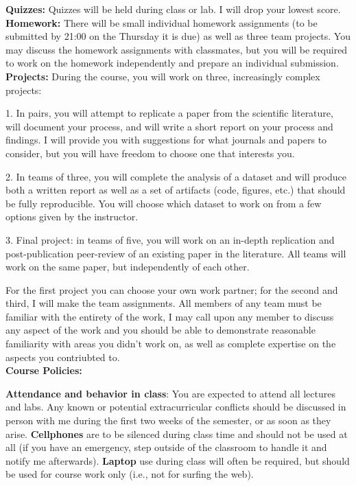 \documentclass[11pt]{article}
\begin{document}
\textbf{Quizzes:} Quizzes will be held during class or lab.  I will drop your
lowest score.\\

\textbf{Homework:} There will be small individual homework assignments (to be
submitted by 21:00 on the Thursday it is due) as well as three team projects.
You may discuss the homework assignments with classmates, but you will be
required to work on the homework independently and prepare an individual
submission.\\


\textbf{Projects:} During the course, you will work on three, increasingly
complex projects:

1. In pairs, you will attempt to replicate a paper from the scientific
literature, will document your process, and will write a short report on your
process and findings.  I will provide you with suggestions for what journals and
papers to consider, but you will have freedom to choose one that interests you.

2. In teams of three, you will complete the analysis of a dataset and will produce both a written report as well as a set of artifacts (code, figures, etc.) that should be fully reproducible.  You will choose which dataset to work on from a few options given by the instructor.

3. Final project: in teams of five, you will work on an in-depth replication and post-publication peer-review of an existing paper in the literature.  All teams will  work on the same paper, but independently of each other.


For the first project you can choose your own work partner; for the second and third, I will make the team assignments. All members of any team must be familiar with the entirety of the work, I may call upon any member to discuss any aspect of the work and you should be able to demonstrate reasonable familiarity with areas you didn't work on, as well as complete expertise on the aspects you contriubted to.\\


\textbf{\large Course Policies:}

\textbf{Attendance and behavior in class}: You are expected to attend all lectures
and labs.  Any known or potential extracurricular conflicts should be discussed
in person with me during the first two weeks of the semester, or as
soon as they arise. \textbf{Cellphones} are to be silenced during class time and should not be used at all (if you have an emergency, step outside of the classroom to handle it and notify me afterwards).
\textbf{Laptop} use during class will often be required, but should be
used for course work only (i.e., not for surfing the web).\\
\end{document}
